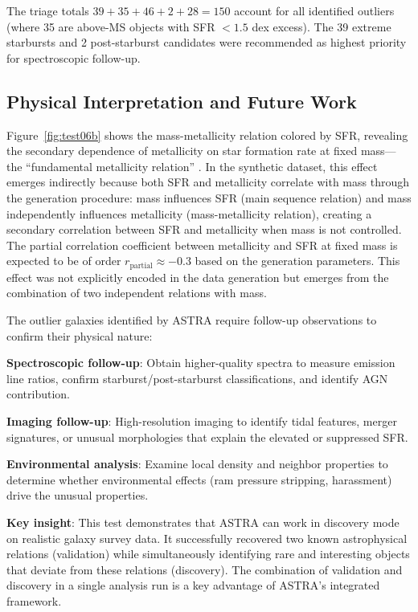 \documentclass[usenatbib]{rasti}
\begin{document}
The triage totals $39 + 35 + 46 + 2 + 28 = 150$ account for all identified outliers (where 35 are above-MS objects with SFR $< 1.5$ dex excess). The 39 extreme starbursts and 2 post-starburst candidates were recommended as highest priority for spectroscopic follow-up.

\subsection{Physical Interpretation and Future Work}

Figure~\ref{fig:test06b} shows the mass-metallicity relation colored by SFR, revealing the secondary dependence of metallicity on star formation rate at fixed mass---the ``fundamental metallicity relation'' \citep{mannucci2010}. In the synthetic dataset, this effect emerges indirectly because both SFR and metallicity correlate with mass through the generation procedure: mass influences SFR (main sequence relation) and mass independently influences metallicity (mass-metallicity relation), creating a secondary correlation between SFR and metallicity when mass is not controlled. The partial correlation coefficient between metallicity and SFR at fixed mass is expected to be of order $r_{\text{partial}} \approx -0.3$ based on the generation parameters. This effect was not explicitly encoded in the data generation but emerges from the combination of two independent relations with mass.

The outlier galaxies identified by ASTRA require follow-up observations to confirm their physical nature:
\begin{description}
\item \textbf{Spectroscopic follow-up}: Obtain higher-quality spectra to measure emission line ratios, confirm starburst/post-starburst classifications, and identify AGN contribution.
\item \textbf{Imaging follow-up}: High-resolution imaging to identify tidal features, merger signatures, or unusual morphologies that explain the elevated or suppressed SFR.
\item \textbf{Environmental analysis}: Examine local density and neighbor properties to determine whether environmental effects (ram pressure stripping, harassment) drive the unusual properties.
\end{description}

\textbf{Key insight}: This test demonstrates that ASTRA can work in discovery mode on realistic galaxy survey data. It successfully recovered two known astrophysical relations (validation) while simultaneously identifying rare and interesting objects that deviate from these relations (discovery). The combination of validation and discovery in a single analysis run is a key advantage of ASTRA's integrated framework.
\end{document}
